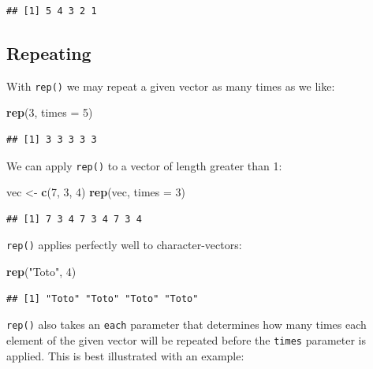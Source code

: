 \documentclass[]{book}
\makeatletter
\newenvironment{Shaded}{\begin{snugshade}}{\end{snugshade}}
\newcommand{\KeywordTok}[1]{\textcolor[rgb]{0.13,0.29,0.53}{\textbf{{#1}}}}
\newcommand{\DataTypeTok}[1]{\textcolor[rgb]{0.13,0.29,0.53}{{#1}}}
\newcommand{\DecValTok}[1]{\textcolor[rgb]{0.00,0.00,0.81}{{#1}}}
\newcommand{\StringTok}[1]{\textcolor[rgb]{0.31,0.60,0.02}{{#1}}}
\newcommand{\NormalTok}[1]{{#1}}
\newenvironment{kframe}{%
\medskip{}
\setlength{\fboxsep}{.8em}
 \def\at@end@of@kframe{}%
 \ifinner\ifhmode%
  \def\at@end@of@kframe{\end{minipage}}%
  \begin{minipage}{\columnwidth}%
 \fi\fi%
 \def\FrameCommand##1{\hskip\@totalleftmargin \hskip-\fboxsep
 \colorbox{shadecolor}{##1}\hskip-\fboxsep
     \hskip-\linewidth \hskip-\@totalleftmargin \hskip\columnwidth}%
 \MakeFramed {\advance\hsize-\width
   \@totalleftmargin\z@ \linewidth\hsize
   \@setminipage}}%
 {\par\unskip\endMakeFramed%
 \at@end@of@kframe}
\renewenvironment{Shaded}{\begin{kframe}}{\end{kframe}}
\theoremstyle{definition}
\theoremstyle{definition}
\theoremstyle{remark}
\makeatother
\begin{document}
\begin{verbatim}
## [1] 5 4 3 2 1
\end{verbatim}

\subsection{Repeating}\label{repeating}

With \texttt{rep()} we may
repeat a given vector as many times as we like:

\begin{Shaded}
\begin{Highlighting}[]
\KeywordTok{rep}\NormalTok{(}\DecValTok{3}\NormalTok{, }\DataTypeTok{times =} \DecValTok{5}\NormalTok{)}
\end{Highlighting}
\end{Shaded}

\begin{verbatim}
## [1] 3 3 3 3 3
\end{verbatim}

We can apply \texttt{rep()} to a vector of length greater than 1:

\begin{Shaded}
\begin{Highlighting}[]
\NormalTok{vec <-}\StringTok{ }\KeywordTok{c}\NormalTok{(}\DecValTok{7}\NormalTok{, }\DecValTok{3}\NormalTok{, }\DecValTok{4}\NormalTok{)}
\KeywordTok{rep}\NormalTok{(vec, }\DataTypeTok{times =} \DecValTok{3}\NormalTok{)}
\end{Highlighting}
\end{Shaded}

\begin{verbatim}
## [1] 7 3 4 7 3 4 7 3 4
\end{verbatim}

\texttt{rep()} applies perfectly well to character-vectors:

\begin{Shaded}
\begin{Highlighting}[]
\KeywordTok{rep}\NormalTok{(}\StringTok{"Toto"}\NormalTok{, }\DecValTok{4}\NormalTok{)}
\end{Highlighting}
\end{Shaded}

\begin{verbatim}
## [1] "Toto" "Toto" "Toto" "Toto"
\end{verbatim}

\texttt{rep()} also takes an \texttt{each} parameter that determines how
many times each element of the given vector will be repeated before the
\texttt{times} parameter is applied. This is best illustrated with an
example:
\end{document}
